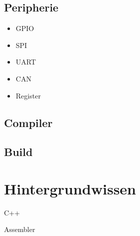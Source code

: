\subsection*{Peripherie}
\begin{itemize}
	\item GPIO
	\item SPI
	\item UART
	\item CAN
	\item Register %
\end{itemize}

\subsection*{Compiler}

\subsection*{Build}

\section{Hintergrundwissen}
C++

Assembler




